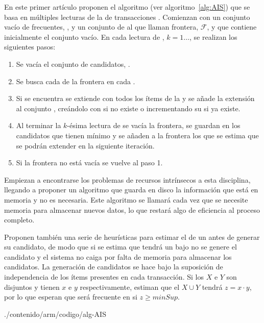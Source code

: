 En este primer artículo proponen el algoritmo  (ver algoritmo~\ref{alg:AIS}) que se basa en múltiples lecturas de la \db de transacciones \D. Comienzan con un conjunto vacío de \itemsets frecuentes, \aprioriL, y un conjunto de \itemsets al que llaman frontera, $\mathcal{F}$, y que contiene inicialmente el conjunto vacío. En cada lectura de \D, $k=1\ldots$, se realizan los siguientes pasos:

\begin{enumerate}
  \item Se vacía el conjunto de candidatos, \aprioriC.
  \item Se busca cada \kitemset[k-1] de la frontera en cada \transaccion.
  \item Si se encuentra se extiende con todos los ítems de la \transaccion y se añade la extensión al conjunto \aprioriC[k+1], creándolo con  si no existe o incrementando su \soporte si ya existe.
  \item Al terminar la $k$-ésima lectura de \D se vacía la frontera, se guardan en \aprioriL[k] los candidatos que tienen \soporte mínimo y se añaden a la frontera los que se estima que se podrán extender en la siguiente iteración.
  \item Si la frontera no está vacía se vuelve al paso 1.
\end{enumerate}

Empiezan a encontrarse los problemas de recursos intrínsecos a esta disciplina, llegando a proponer un algoritmo que guarda en disco la información que está en memoria y no es necesaria. Este algoritmo se llamará cada vez que se necesite memoria para almacenar nuevos datos, lo que restará algo de eficiencia al proceso completo.

Proponen también una serie de heurísticas para estimar el \soporte de un \kitemset antes de generar su candidato, de modo que si se estima que tendrá un \soporte bajo no se genere el candidato y el sistema no caiga por falta de memoria para almacenar los candidatos. La generación de candidatos se hace bajo la suposición de independencia de los ítems presentes en cada transacción. Si los \itemsets $X$ e $Y$ son disjuntos y tienen \soporte $x$ e $y$ respectivamente, estiman que el \itemset $X \cup Y$ tendrá \soporte $z = x\cdot y$, por lo que esperan que será frecuente en \D si $z \geq minSup$.


                {./contenido/arm/codigo/alg-AIS}%

